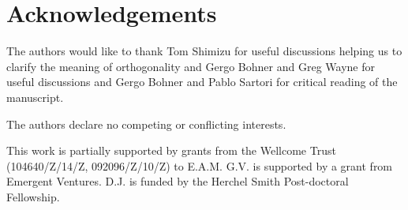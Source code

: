 
\section*{Acknowledgements}
The authors would like to thank Tom Shimizu for useful discussions helping us to clarify the meaning of orthogonality and Gergo Bohner and Greg Wayne for useful discussions and Gergo Bohner and Pablo Sartori for critical reading of the manuscript.

\vspace{2mm}
The authors declare no competing or conflicting interests.

\vspace{2mm}
This work is partially supported by grants from the Wellcome Trust (104640/Z/14/Z, 092096/Z/10/Z) to E.A.M.  G.V. is supported by a grant from Emergent Ventures.  D.J. is funded by the Herchel Smith Post-doctoral Fellowship.  